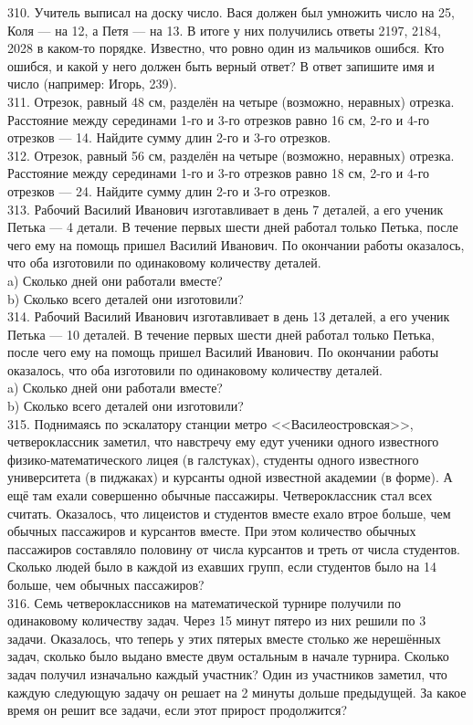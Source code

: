 \documentclass[12pt]{article}
\begin{document}
310. Учитель выписал на доску число. Вася должен был умножить число на 25, Коля --- на 12, а Петя --- на 13. В итоге у них получились ответы 2197, 2184, 2028 в каком-то порядке. Известно, что ровно один из мальчиков ошибся. Кто ошибся, и какой у него должен быть верный ответ? В ответ запишите имя и число (например: Игорь, 239).\\
311. Отрезок, равный 48 см, разделён на четыре (возможно, неравных) отрезка. Расстояние между серединами 1-го и 3-го отрезков равно 16 см, 2-го и 4-го отрезков --- 14. Найдите сумму длин 2-го и 3-го отрезков.\\
312. Отрезок, равный 56 см, разделён на четыре (возможно, неравных) отрезка. Расстояние между серединами 1-го и 3-го отрезков равно 18 см, 2-го и 4-го отрезков --- 24. Найдите сумму длин 2-го и 3-го отрезков.\\
313. Рабочий Василий Иванович изготавливает в день 7 деталей, а его ученик Петька --- 4 детали. В течение первых шести дней работал только Петька, после чего ему на помощь пришел Василий Иванович. По окончании работы оказалось, что оба изготовили по одинаковому количеству деталей.\\
a) Сколько дней они работали вместе?\\
b) Сколько всего деталей они изготовили?\\
314. Рабочий Василий Иванович изготавливает в день 13 деталей, а его ученик Петька --- 10 деталей. В течение первых шести дней работал только Петька, после чего ему на помощь пришел Василий Иванович. По окончании работы оказалось, что оба изготовили по одинаковому количеству деталей.\\
a) Сколько дней они работали вместе?\\
b) Сколько всего деталей они изготовили?\\
315. Поднимаясь по эскалатору станции метро <<Василеостровская>>, четвероклассник заметил, что навстречу ему едут ученики одного известного физико-математического лицея (в галстуках), студенты одного известного университета (в пиджаках) и курсанты одной известной академии (в форме). А ещё там ехали совершенно обычные пассажиры. Четвероклассник стал всех считать. Оказалось, что лицеистов и студентов вместе ехало втрое больше, чем обычных пассажиров и курсантов вместе. При этом количество обычных пассажиров составляло половину от числа курсантов и треть от числа студентов. Сколько людей было в каждой из ехавших групп, если студентов было на 14 больше, чем обычных пассажиров?\\
316. Семь четвероклассников на математической турнире получили по одинаковому количеству задач. Через 15 минут пятеро из них решили по 3 задачи. Оказалось, что теперь у этих пятерых вместе столько же нерешённых задач, сколько было выдано вместе двум остальным в начале турнира. Сколько задач получил изначально каждый участник? Один из участников заметил, что каждую следующую задачу он решает на 2 минуты дольше предыдущей. За какое время он решит все задачи, если этот прирост продолжится?\\
\end{document}
